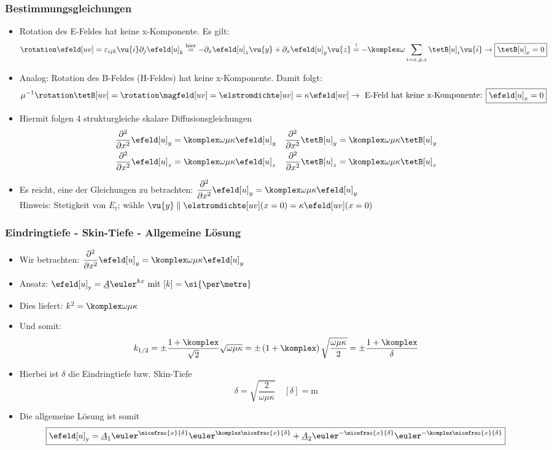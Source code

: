 \begin{frame}
  \frametitle{Bestimmungsgleichungen}
  \begin{itemize}[<+->]
  \item Rotation des E-Feldes hat keine x-Komponente. Es gilt:
$$
\rotation \efeld[uv] = \varepsilon_{ijk} \vu{i} \partial_j\efeld[u]_k \stackrel{\text{hier}}{=} -\partial_x\efeld[u]_z \vu{y} + \partial_x\efeld[u]_y \vu{z} \stackrel{!}{=} -\komplex\omega   \sum_{i=x,y,z}\tetB[u]_i \vu{i} \to \boxed{\tetB[u]_x=0}
$$
\item Analog: Rotation des B-Feldes (H-Feldes) hat keine x-Komponente. Damit folgt:
  $$
  \mu^{-1} \rotation\tetB[uv] = \rotation \magfeld[uv] = \elstromdichte[uv] = \kappa\efeld[uv] \to \text{ E-Feld hat keine x-Komponente: } \boxed{\efeld[u]_x=0} 
  $$
\item Hiermit folgen 4 strukturgleiche skalare Diffusionsgleichungen
 \begin{align*}
\dfrac{\partial^2}{\partial x^2} \efeld[u]_y &= \komplex \omega \mu \kappa \efeld[u]_y & \dfrac{\partial^2}{\partial x^2} \tetB[u]_y &= \komplex \omega \mu \kappa \tetB[u]_y \\
\dfrac{\partial^2}{\partial x^2} \efeld[u]_z &= \komplex \omega \mu \kappa \efeld[u]_z & \dfrac{\partial^2}{\partial x^2} \tetB[u]_z &= \komplex \omega \mu \kappa \tetB[u]_z 
 \end{align*}
\item Es reicht, eine der Gleichungen zu betrachten: $\dfrac{\partial^2}{\partial x^2} \efeld[u]_y = \komplex \omega \mu \kappa \efeld[u]_y$ \\
  Hinweis: Stetigkeit von $E_t$; \alert{wähle} $\vu{y} \parallel \elstromdichte[uv](x=0) = \kappa\efeld[uv](x=0)$
  \end{itemize}
\end{frame}


\begin{frame}
  \frametitle{Eindringtiefe - Skin-Tiefe - Allgemeine Lösung}
  \begin{itemize}[<+->]
  \item Wir betrachten: $\dfrac{\partial^2}{\partial x^2} \efeld[u]_y = \komplex \omega \mu \kappa \efeld[u]_y$
  \item Ansatz: $\efeld[u]_\mathrm{y} = \underline{A} \euler^{k x} \text{ mit } [k] = \si{\per\metre} $
  \item Dies liefert: $k^2 = \komplex \omega \mu \kappa$
    \item Und somit:
$$
	k_{1/2} = \pm \dfrac{1 + \komplex}{\sqrt{2}} \sqrt{\omega \mu \kappa}
		= \pm \left( 1 + \komplex \right) \sqrt{\dfrac{\omega \mu \kappa}{2}}
		= \pm \dfrac{1 + \komplex}{\delta}
$$
\item Hierbei ist $\delta$ die \alert{Eindringtiefe} bzw. \alert{Skin-Tiefe}
  $$
  \boxed{ \delta = \sqrt{\dfrac{2}{\omega \mu \kappa}} } \quad [\delta] =\si{\metre}
  $$
\item Die allgemeine Lösung ist somit
  $$
  \boxed{\efeld[u]_\mathrm{y} = \underline{A}_1 \euler^{\nicefrac{x}{\delta}} \euler^{\komplex \nicefrac{x}{\delta}} + \underline{A}_2  \euler^{-\nicefrac{x}{\delta}} \euler^{-\komplex \nicefrac{x}{\delta}} }
  $$
  \end{itemize}
\end{frame}


